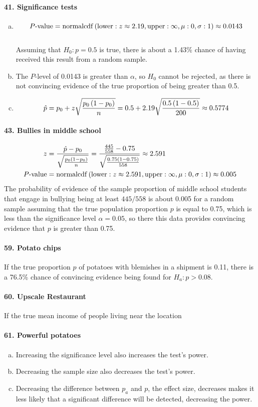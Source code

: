 			\paragraph{41. Significance tests}
				\begin{enumerate}[a.]
					\item
						$$P\text{-value} = \operatorname{normalcdf}\left(\operatorname{lower}: z \approx 2.19, \operatorname{upper}: \infty, \mu: 0, \sigma: 1\right) \approx 0.0143$$ \\
						Assuming that $H_0:p = 0.5$ is true, there is about a 1.43\% chance of having received this result from a random sample.
					\item
						The $P$-level of 0.0143 is greater than $\alpha$, so $H_0$ cannot be rejected, as there is not convincing evidence of the true proportion of being greater than 0.5.
					\item
						$$\hat{p} = p_0 + z\sqrt{\frac{p_0\left(1 - p_0\right)}{n}} = 0.5 + 2.19\sqrt{\frac{0.5\left(1 - 0.5\right)}{200}} \approx 0.5774$$
				\end{enumerate}
			\paragraph{43. Bullies in middle school}
				\begin{align*}
					z &= \frac{\hat{p} - p_0}{\sqrt{\frac{p_0\left(1 - p_0\right)}{n}}} = \frac{\frac{445}{558} - 0.75}{\sqrt{\frac{0.75\left(1 - 0.75\right)}{558}}} \approx 2.591 \\ 
					P\text{-value} &= \operatorname{normalcdf}\left(\operatorname{lower}: z \approx 2.591, \operatorname{upper}: \infty, \mu: 0, \sigma: 1\right) \approx 0.005
				\end{align*}
				The probability of evidence of the sample proportion of middle school students that engage in bullying being at least $445/558$ is about 0.005 for a random sample assuming that the true population proportion $p$ is equal to 0.75, which is less than the significance level $\alpha = 0.05$, so there this data provides convincing evidence that $p$ is greater than 0.75.
			\paragraph{59. Potato chips}
				If the true proportion $p$ of potatoes with blemishes in a shipment is 0.11, there is a 76.5\% chance of convincing evidence being found for $H_a: p > 0.08$.
			\paragraph{60. Upscale Restaurant}
				If the true mean income of people living near the location 
			\paragraph{61. Powerful potatoes}
				\begin{enumerate}[a.]
					\item
						Increasing the significance level also increases the test's power.
					\item
						Decreasing the sample size also decreases the test's power.
					\item
						Decreasing the difference between $p_a$ and $p$, the effect size, decreases makes it less likely that a significant difference will be detected, decreasing the power.
				\end{enumerate}
